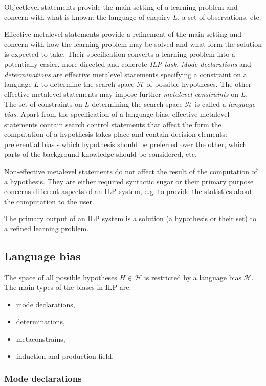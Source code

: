Objectlevel statements provide the main setting of a learning problem and concern with what is known: the language of enquiry $L$, a set of observations, etc.

Effective metalevel statements provide a refinement of the main setting and concern with how the learning problem may be solved and what form the solution is expected to take. Their specification converts a learning problem into a potentially easier, more directed and concrete \emph{ILP task}.
\emph{Mode declarations} and \emph{determinations} are effective metalevel statements specifying a constraint on a language $L$ to determine the search space $\mathcal{H}$ of possible hypotheses. The other effective metalevel statements may impose further \emph{metalevel constraints} on $L$. The set of constraints on $L$ determining the search space $\mathcal{H}$ is called a \emph{language bias}.
Apart from the specification of a language bias, effective metalevel statements contain search control statements that affect the form the computation of a hypothesis takes place and contain decision elements: preferential bias - which hypothesis should be preferred over the other, which parts of the background knowledge should be considered, etc.

Non-effective metalevel statements do not affect the result of the computation of a hypothesis. They are either required syntactic sugar or their primary purpose concerns different aspects of an ILP system, e.g. to provide the statistics about the computation to the user.

The primary output of an ILP system is a solution (a hypothesis or their set) to a refined learning problem.

\subsection{Language bias}\label{subsec:background_language_bias}
The space of all possible hypotheses $H \in \mathcal{H}$ is restricted by a language bias $\mathcal{H}$. The main types of the biases in ILP are:
\begin{itemize}
\item mode declarations,
\item determinations,
\item metaconstrains,
\item induction and production field.
\end{itemize}

\subsubsection{Mode declarations}\label{background_mode_declarations}
